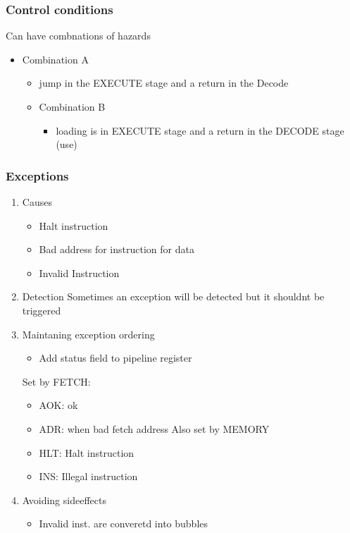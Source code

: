 \documentclass[11pt]{article}
\begin{document}
\subsubsection{Control conditions}
\label{sec:orgheadline51}
Can have combnations of hazards
\begin{itemize}
\item Combination A
\begin{itemize}
\item jump in the EXECUTE stage and a return in the Decode
\end{itemize}
\begin{itemize}
\item Combination B
\begin{itemize}
\item loading is in EXECUTE stage and a return in the DECODE stage (use)
\end{itemize}
\end{itemize}
\end{itemize}
\subsubsection{Exceptions}
\label{sec:orgheadline56}
\begin{enumerate}
\item Causes
\label{sec:orgheadline52}
\begin{itemize}
\item Halt instruction
\item Bad address for instruction for data
\item Invalid Instruction
\end{itemize}
\item Detection
\label{sec:orgheadline53}
Sometimes an exception will be detected but it shouldnt be triggered
\item Maintaning exception ordering
\label{sec:orgheadline54}
\begin{itemize}
\item Add status field to pipeline register
\end{itemize}
Set by FETCH:
\begin{itemize}
\item AOK: ok
\item ADR: when bad fetch address
Also set by MEMORY
\item HLT: Halt instruction
\item INS: Illegal instruction
\end{itemize}
\item Avoiding sideeffects
\label{sec:orgheadline55}
\begin{itemize}
\item Invalid inst. are converetd into bubbles
\end{itemize}
\end{enumerate}
\end{document}
